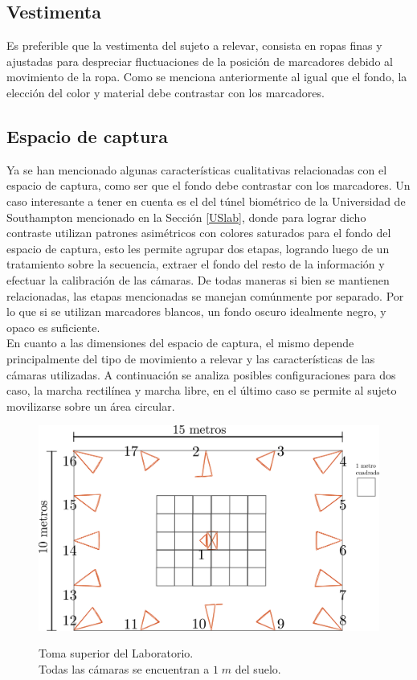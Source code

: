 \subsection{Vestimenta}
Es preferible que la vestimenta del sujeto a relevar, consista en ropas finas y ajustadas para despreciar fluctuaciones de la posición de marcadores debido al movimiento de la ropa. Como se menciona anteriormente al igual que el fondo, la elección del color y material debe contrastar con los marcadores.

\subsection{Espacio de captura}

Ya se han mencionado algunas características cualitativas relacionadas con el espacio de captura, como ser que el fondo debe contrastar con los marcadores. Un caso interesante a tener en cuenta es el del túnel biométrico de la Universidad de Southampton mencionado en la Sección \ref{USlab}, donde para lograr dicho contraste utilizan patrones asimétricos con colores saturados para el fondo del espacio de captura, esto les permite agrupar dos etapas, logrando luego de un tratamiento sobre la secuencia, extraer el fondo del resto de la información y efectuar la calibración de las cámaras. De todas maneras si bien se mantienen relacionadas, las etapas mencionadas se manejan comúnmente por separado. Por lo que si se utilizan marcadores blancos, un fondo oscuro idealmente negro, y opaco es suficiente.\\

En cuanto a las dimensiones del espacio de captura, el mismo depende principalmente del tipo de movimiento a relevar y las características de las cámaras utilizadas. A continuación se analiza posibles configuraciones para dos caso, la marcha rectilínea y marcha libre, en el último caso se permite al sujeto movilizarse sobre un área circular.


\begin{figure}[H]
  \centering
  {\includegraphics[scale=0.16]{img/Base_Datos/Laboratorio.pdf}}      
  \caption{Toma superior del Laboratorio.\\ Todas las cámaras se encuentran a $1\;m$ del suelo.}
  \label{img_Laboratorio}
\end{figure}  
 

